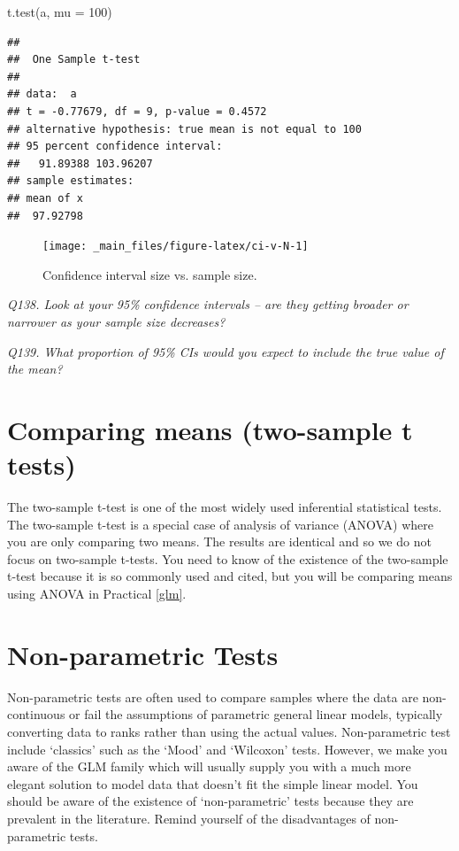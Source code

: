 \documentclass[
  11pt,
  a4paper,
]{book}
\newenvironment{Shaded}{\begin{snugshade}}{\end{snugshade}}
\newcommand{\AttributeTok}[1]{\textcolor[rgb]{0.77,0.63,0.00}{#1}}
\newcommand{\DecValTok}[1]{\textcolor[rgb]{0.00,0.00,0.81}{#1}}
\newcommand{\FunctionTok}[1]{\textcolor[rgb]{0.00,0.00,0.00}{#1}}
\newcommand{\NormalTok}[1]{#1}
\begin{document}
\begin{Shaded}
\begin{Highlighting}[]
\FunctionTok{t.test}\NormalTok{(a, }\AttributeTok{mu =} \DecValTok{100}\NormalTok{)}
\end{Highlighting}
\end{Shaded}

\begin{verbatim}
## 
##  One Sample t-test
## 
## data:  a
## t = -0.77679, df = 9, p-value = 0.4572
## alternative hypothesis: true mean is not equal to 100
## 95 percent confidence interval:
##   91.89388 103.96207
## sample estimates:
## mean of x 
##  97.92798
\end{verbatim}

\begin{figure}

{\centering \texttt{[image: \_main\_files/figure-latex/ci-v-N-1]} 

}

\caption{Confidence interval size vs. sample size.}\label{fig:ci-v-N}
\end{figure}

\emph{Q138. Look at your 95\% confidence intervals -- are they getting broader or narrower as your sample size decreases?}

\emph{Q139. What proportion of 95\% CIs would you expect to include the true value of the mean?}

\hypertarget{comparing-means-two-sample-t-tests}{%
\section{Comparing means (two-sample t tests)}\label{comparing-means-two-sample-t-tests}}

The two-sample t-test is one of the most widely used inferential statistical tests. The two-sample t-test is a special case of analysis of variance (ANOVA) where you are only comparing two means. The results are identical and so we do not focus on two-sample t-tests. You need to know of the existence of the two-sample t-test because it is so commonly used and cited, but you will be comparing means using ANOVA in Practical \ref{glm}.

\hypertarget{non-parametric-tests}{%
\section{Non-parametric Tests}\label{non-parametric-tests}}

Non-parametric tests are often used to compare samples where the data are non-continuous or fail the assumptions of parametric general linear models, typically converting data to ranks rather than using the actual values. Non-parametric test include `classics' such as the `Mood' and `Wilcoxon' tests. However, we make you aware of the GLM family which will usually supply you with a much more elegant solution to model data that doesn't fit the simple linear model. You should be aware of the existence of `non-parametric' tests because they are prevalent in the literature. Remind yourself of the disadvantages of non-parametric tests.
\end{document}
